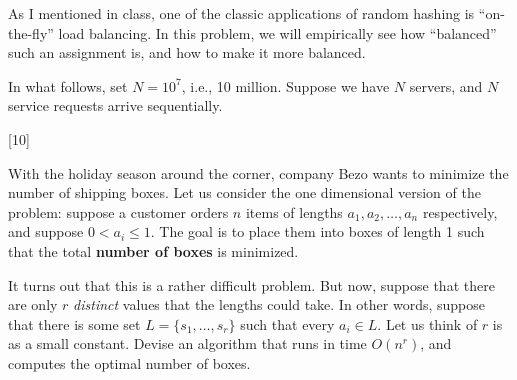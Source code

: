 \documentclass[addpoints]{exam}
\begin{document}
\begin{questions}

  As I mentioned in class, one of the classic applications of random hashing is ``on-the-fly'' load balancing. In this problem, we will empirically see how ``balanced'' such an assignment is, and how to make it more balanced.

  In what follows, set $N = 10^7$, i.e., 10 million. Suppose we have $N$ servers, and $N$ service requests arrive sequentially.


  [10]

  With the holiday season around the corner, company Bezo wants to minimize the number of shipping boxes. Let us consider the one dimensional version of the problem: suppose a customer orders $n$ items of lengths $a_1, a_2, \dots, a_n$ respectively, and suppose $0 < a_i \le 1$. The goal is to place them into boxes of length 1 such that the total {\bf number of boxes} is minimized.

  It turns out that this is a rather difficult problem. But now, suppose that there are only $r$ {\em distinct} values that the lengths could take. In other words, suppose that there is some set $L = \{s_1, \dots, s_r\}$ such that every $a_i \in L$. Let us think of $r$ is as a small constant.  Devise an algorithm that runs in time $O(n^r)$, and computes the optimal number of boxes.


\end{questions}
\end{document}
